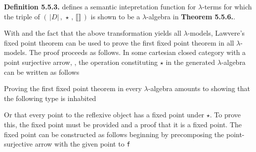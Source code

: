 \textbf{Definition 5.5.3.} defines a semantic intepretation function for
$\lambda$-terms for which the triple of $( \, |D| \, , \, \star \, , \,
\llbracket \rrbracket \,)$ is shown to be  a $\lambda$-algebra in
\textbf{Theorem 5.5.6.}.


With  and the fact that the above transformation yields
all $\lambda$-models, Lawvere's fixed point theorem can be used to prove the
first fixed point theorem in all $\lambda$-models. The proof proceeds as
follows. In some cartesian closed category with a point surjective arrow,
, the operation constituting $\star$ in the generated
$\lambda$-algebra can be written as follows


Proving the first fixed point theorem in every $\lambda$-algebra amounts to
showing that the following type is inhabited

Or that every point to the reflexive object has a fixed point under $\star$. To
prove this, the fixed point must be provided and a proof that it is a fixed
point. The fixed point can be constructed as follows beginning by precomposing the
point-surjective arrow with the given point to \verb|f|

